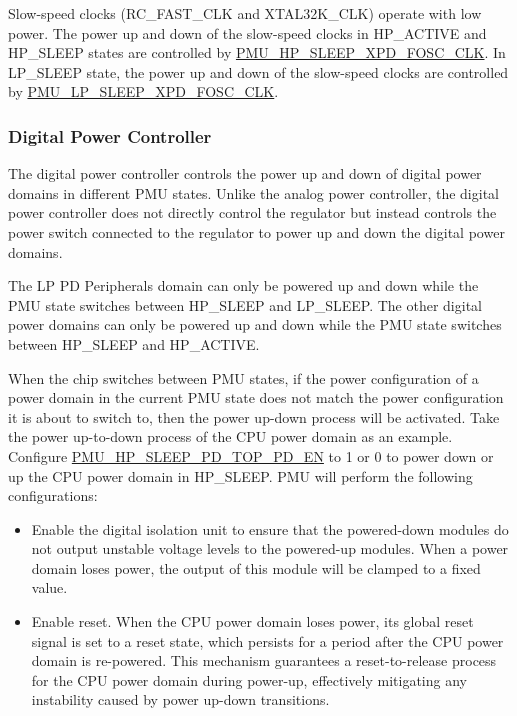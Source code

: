 \documentclass[main\_\_EN.tex]{subfiles}
\begin{document}
Slow-speed clocks (RC\_FAST\_CLK and XTAL32K\_CLK) operate with low power. The power up and down of the slow-speed clocks in HP\_ACTIVE and HP\_SLEEP states are controlled by \hyperref[fielddesc:PMUHPSLEEPXPDFOSCCLK]{PMU\_HP\_SLEEP\_XPD\_FOSC\_CLK}. In LP\_SLEEP state, the power up and down of the slow-speed clocks are controlled by \hyperref[fielddesc:PMULPSLEEPXPDFOSCCLK]{PMU\_LP\_SLEEP\_XPD\_FOSC\_CLK}.

\subsubsection{Digital Power Controller}

The digital power controller controls the power up and down of digital power domains in different PMU states. Unlike the analog power controller, the digital power controller does not directly control the regulator but instead controls the power switch connected to the regulator to power up and down the digital power domains.

The LP PD Peripherals domain can only be powered up and down while the PMU state switches between HP\_SLEEP and LP\_SLEEP. The other digital power domains can only be powered up and down while the PMU state switches between HP\_SLEEP and HP\_ACTIVE.

When the chip switches between PMU states, if the power configuration of a power domain in the current PMU state does not match the power configuration it is about to switch to, then the power up-down process will be activated. Take the power up-to-down process of the CPU power domain as an example. Configure \hyperref[fielddesc:PMUHPSLEEPPDTOPPDEN]{PMU\_HP\_SLEEP\_PD\_TOP\_PD\_EN} to 1 or 0 to power down or up the CPU power domain in HP\_SLEEP. PMU will perform the following configurations:

\begin{itemize}

\item Enable the digital isolation unit to ensure that the powered-down modules do not output unstable voltage levels to the powered-up modules. When a power domain loses power, the output of this module will be clamped to a fixed value.

\item Enable reset. When the CPU power domain loses power, its global reset signal is set to a reset state, which persists for a period after the CPU power domain is re-powered. This mechanism guarantees a reset-to-release process for the CPU power domain during power-up, effectively mitigating any instability caused by power up-down transitions.
\end{itemize}
\end{document}
